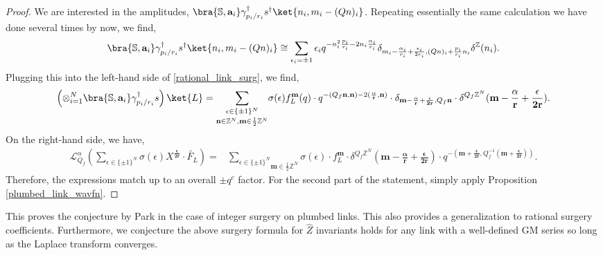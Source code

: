 \documentclass{article}
\newcommand{\Z}{{\mathbb Z}}
\numberwithin{corollary}{theorem}
\numberwithin{corollary}{proposition}
\begin{document}
\begin{proof}
    We are interested in the amplitudes, $\bra{\mathbb{S},\mathbf{a}_i} \gamma_{p_i/r_i}^\dagger s^\dagger \ket{n_i, m_i -(Qn)_i}$. Repeating essentially the same calculation we have done several times by now, we find, 
$$\bra{\mathbb{S},\mathbf{a}_i} \gamma_{p_i/r_i}^\dagger s^\dagger \ket{n_i, m_i -(Qn)_i} \cong \sum_{\epsilon_i = \pm1} \epsilon_i q^{-n_i^2 \frac{p_i}{r_i} - 2n_i \frac{\alpha_i}{r_i}} \delta_{m_i - \frac{\alpha_i}{r_i} +\frac{\epsilon_i}{2 r_i} , (Qn)_i + \frac{p_i}{r_i} n_i} \delta^\mathbb{Z}(n_i) . $$
Plugging this into the left-hand side of \eqref{rational_link_surg}, we find, 
$$\left(\otimes^N_{i=1} \bra{\mathbb{S},\mathbf{a}_i} \gamma_{p_i/r_i}^\dagger s\right) \ket{L} = \underset{ \mathbf{n} \in \mathbb{Z}^N, \mathbf{m}\in \frac{1}{2}\Z ^N}{\sum_{\epsilon \in \{\pm1 \}^N}} \sigma(\epsilon) f^\mathbf{m}_L(q) \cdot q^{-(Q_f \mathbf{n} , \mathbf{n}) -2 (\mathbf{\frac{\alpha}{r}}, \mathbf{n})} \cdot  \delta_{\mathbf{m} -\mathbf{\frac{\alpha}{r}} +\mathbf{\frac{\epsilon}{2r}} , Q_f \mathbf{n}} \cdot  \delta^{Q_f\mathbb{Z}^N}(\mathbf{m} -\mathbf{\frac{\alpha}{r}}+\mathbf{\frac{\epsilon}{2r}}).$$
On the right-hand side, we have, 
\begin{align*}
   \mathcal{L}^\alpha_{Q_f} \left( \sum_{\epsilon \in \{\pm1 \}^N} \sigma(\epsilon) X^{\mathbf{\frac{\epsilon}{2r}}} \cdot \tilde{F_L}\right)  = &  \underset{\mathbf{m}\in \frac{1}{2}\Z ^N}{\sum_{\epsilon \in \{\pm1 \}^N} }\sigma(\epsilon) \cdot f^\mathbf{m}_L \cdot \delta^{Q_f\mathbb{Z}^N}(\mathbf{m} -\mathbf{\frac{\alpha}{r}}+\mathbf{\frac{\epsilon}{2r}}) \cdot q^{- (\mathbf{m} +\mathbf{\frac{\epsilon}{2 r}},Q_f^{-1} (\mathbf{m} +\mathbf{\frac{\epsilon}{2 r}}))}.
\end{align*}
Therefore, the expressions match up to an overall $\pm q^{c}$ factor. For the second part of the statement, simply apply Proposition \ref{plumbed_link_wavfn}.
\end{proof}

This proves the conjecture by Park \cite{S2} in the case of integer surgery on plumbed links. This also provides a generalization to rational surgery coefficients. Furthermore, we conjecture the above surgery formula for $\hat{Z}$ invariants holds for any link with a well-defined GM series so long as the Laplace transform converges. 
\end{document}
